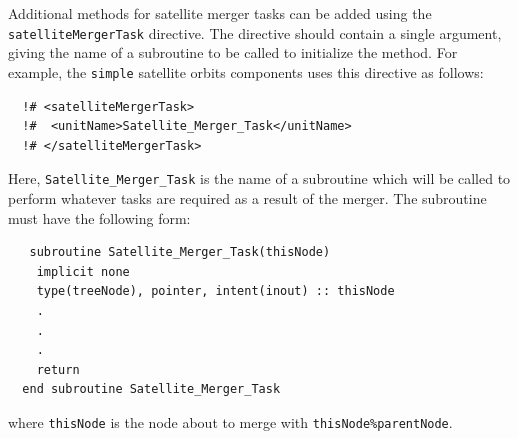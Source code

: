 Additional methods for satellite merger tasks can be added using the {\tt satelliteMergerTask} directive. The directive should contain a single argument, giving the name of a subroutine to be called to initialize the method. For example, the {\tt simple} satellite orbits components uses this directive as follows:
\begin{verbatim}
  !# <satelliteMergerTask>
  !#  <unitName>Satellite_Merger_Task</unitName>
  !# </satelliteMergerTask>
\end{verbatim}
Here, {\tt Satellite\_Merger\_Task} is the name of a subroutine which will be called to perform whatever tasks are required as a result of the merger. The subroutine must have the following form:
\begin{verbatim}
   subroutine Satellite_Merger_Task(thisNode)
    implicit none
    type(treeNode), pointer, intent(inout) :: thisNode
    .
    .
    .
    return
  end subroutine Satellite_Merger_Task
\end{verbatim}
where {\tt thisNode} is the node about to merge with {\tt thisNode\%parentNode}.

